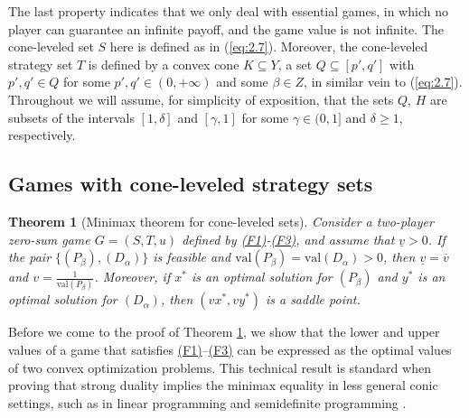 \documentclass[11pt, twoside]{article}
\numberwithin{equation}{section}
\newtheorem{theorem}{Theorem}[section]
\theoremstyle{definition}
\begin{document}
 The last property indicates that we only deal with essential games, in which no player can guarantee an infinite payoff, and the game value is not infinite. The cone-leveled set $S$ here is defined as in (\ref{eq:2.7}). Moreover, the cone-leveled strategy set $T$ is defined by a convex cone $K\subseteq Y$, a set $Q\subseteq[p',q']$ \big{(}with $p',q'\in Q$ for some $p',q'\in (0,+\infty)$\big{)} and some $\beta\in Z$, in similar vein to (\ref{eq:2.7}). Throughout we will assume, for simplicity of exposition, that the sets $Q$, $H$ are subsets of the intervals $[1,\delta]$ and $[\gamma,1]$ for some $\gamma\in(0,1]$ and $\delta\geq1$, respectively.

 \vspace{-0.1cm}\subsection{Games with cone-leveled strategy sets}\label{sec:3.1}\vspace{-0.2cm}


\begin{theorem}[Minimax theorem for cone-leveled sets]\label{th:3.1}
Consider a two-player zero-sum game $G=(S,T,u)$ defined by \hyperlink{f1}{(F1)}-\hyperlink{f3}{(F3)}, and assume that $\underline{v}>0$. If the pair \hyperlink{newprimaldual}{$\{(P_\beta),(D_\alpha)\}$} is feasible and $\text{val}(P_\beta)=\text{val}(D_\alpha)>0$, then $\underline{v}=\overline{v}$ and $v=\frac{1}{\text{val}(P_\beta)}$. Moreover, if $x^*$ is an optimal solution for \hyperlink{primalbeta}{$(P_\beta)$} and $y^*$ is an optimal solution for \hyperlink{dualalpha}{$(D_\alpha)$}, then $(vx^*,vy^*)$ is a saddle point.
\end{theorem}

Before we come to the proof of Theorem \ref{th:3.1}, we show that the lower and upper values of a game that satisfies \hyperlink{f1}{(F1)}--\hyperlink{f3}{(F3)} can be expressed as the optimal values of two convex optimization problems. This technical result is standard when proving that strong duality implies the minimax equality in less general conic settings, such as in linear programming \cite[pp. 286]{dantzig2016linear} and semidefinite programming \cite[Lemmas 4.4, 4.5]{ickstadt2024semidefinite}.
\end{document}
